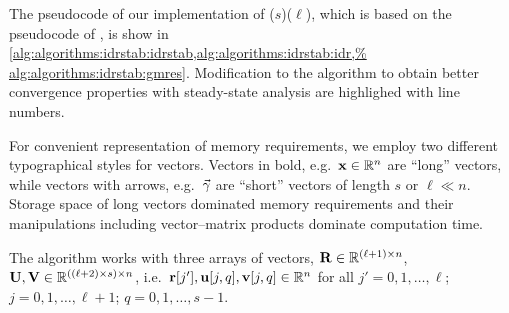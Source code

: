 The pseudocode of our implementation of
($s$)($\ell$), which is based on the
pseudocode of \citet{sleijpen2010exploiting}, is show in
\cref{alg:algorithms:idrstab:idrstab,alg:algorithms:idrstab:idr,%
alg:algorithms:idrstab:gmres}. Modification to the algorithm to obtain
better convergence properties with  steady-state analysis
are highlighed with  line numbers.

For convenient representation of memory requirements, we employ two
different typographical styles for vectors. Vectors in bold,
e.g.~$\bm{\mathrm{x}} \in \mathbb{R}^n$ are ``long'' vectors, while vectors with
arrows, e.g.~$\vecarrow{\gamma}$ are ``short'' vectors of length $s$
or $\ell \ll n$. Storage space of long vectors dominated memory
requirements and their manipulations including vector--matrix products
dominate computation time.

The algorithm works with three arrays of vectors,
$\bm{\mathrm{R}} \in \mathbb{R}^{(\ell + 1) \times n}$,
$\bm{\mathrm{U}}, \bm{\mathrm{V}} \in \mathbb{R}^{((\ell + 2) \times s) \times n}$,
i.e.~$\bm{\mathrm{r}}[j'], \bm{\mathrm{u}}[j, q], \bm{\mathrm{v}}[j, q] \in \mathbb{R}^n$ for all
$j' = 0, 1, \ldots, \ell$; $j = 0, 1, \ldots, \ell + 1$;
$q = 0, 1, \ldots, s - 1$.

